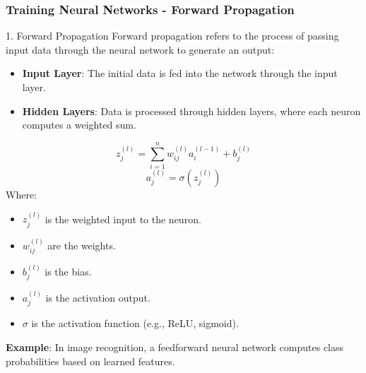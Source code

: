 \documentclass[aspectratio=169]{beamer}
\begin{document}
\begin{frame}[fragile]
    \frametitle{Training Neural Networks - Forward Propagation}
    \begin{block}{1. Forward Propagation}
        Forward propagation refers to the process of passing input data through the neural network to generate an output:
        \begin{itemize}
            \item \textbf{Input Layer}: The initial data is fed into the network through the input layer.
            \item \textbf{Hidden Layers}: Data is processed through hidden layers, where each neuron computes a weighted sum.
        \end{itemize}
        
        \begin{equation}
            z_j^{(l)} = \sum_{i=1}^{n} w_{ij}^{(l)} a_i^{(l-1)} + b_j^{(l)}
        \end{equation}
        \begin{equation}
            a_j^{(l)} = \sigma(z_j^{(l)})
        \end{equation}
        Where:
        \begin{itemize}
            \item \(z_j^{(l)}\) is the weighted input to the neuron.
            \item \(w_{ij}^{(l)}\) are the weights.
            \item \(b_j^{(l)}\) is the bias.
            \item \(a_j^{(l)}\) is the activation output.
            \item \(\sigma\) is the activation function (e.g., ReLU, sigmoid).
        \end{itemize}
        
        \textbf{Example}: In image recognition, a feedforward neural network computes class probabilities based on learned features.
    \end{block}
\end{frame}
\end{document}
